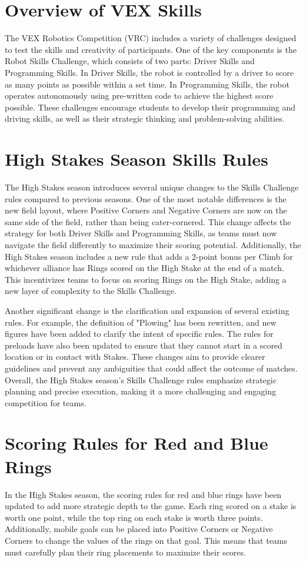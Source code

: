 \section*{Overview of VEX Skills}
The VEX Robotics Competition (VRC) includes a variety of challenges designed to test the skills and creativity of participants. One of the key components is the Robot Skills Challenge, which consists of two parts: Driver Skills and Programming Skills. In Driver Skills, the robot is controlled by a driver to score as many points as possible within a set time. In Programming Skills, the robot operates autonomously using pre-written code to achieve the highest score possible. These challenges encourage students to develop their programming and driving skills, as well as their strategic thinking and problem-solving abilities.

\section*{High Stakes Season Skills Rules}
The High Stakes season introduces several unique changes to the Skills Challenge rules compared to previous seasons. One of the most notable differences is the new field layout, where Positive Corners and Negative Corners are now on the same side of the field, rather than being cater-cornered. This change affects the strategy for both Driver Skills and Programming Skills, as teams must now navigate the field differently to maximize their scoring potential. Additionally, the High Stakes season includes a new rule that adds a 2-point bonus per Climb for whichever alliance has Rings scored on the High Stake at the end of a match. This incentivizes teams to focus on scoring Rings on the High Stake, adding a new layer of complexity to the Skills Challenge.

Another significant change is the clarification and expansion of several existing rules. For example, the definition of "Plowing" has been rewritten, and new figures have been added to clarify the intent of specific rules. The rules for preloads have also been updated to ensure that they cannot start in a scored location or in contact with Stakes. These changes aim to provide clearer guidelines and prevent any ambiguities that could affect the outcome of matches. Overall, the High Stakes season's Skills Challenge rules emphasize strategic planning and precise execution, making it a more challenging and engaging competition for teams.

\section*{Scoring Rules for Red and Blue Rings}
In the High Stakes season, the scoring rules for red and blue rings have been updated to add more strategic depth to the game. Each ring scored on a stake is worth one point, while the top ring on each stake is worth three points. Additionally, mobile goals can be placed into Positive Corners or Negative Corners to change the values of the rings on that goal. This means that teams must carefully plan their ring placements to maximize their scores.


